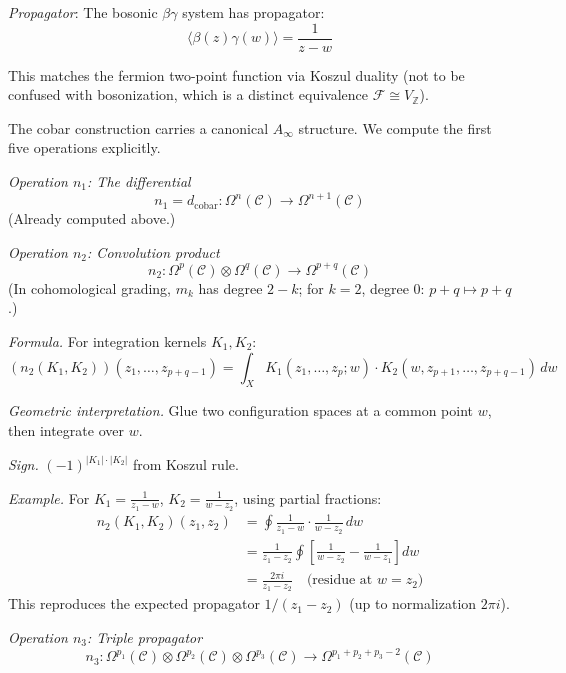 \begin{example}
\emph{Propagator}: The bosonic $\beta\gamma$ system has propagator:
\[\langle \beta(z) \gamma(w) \rangle = \frac{1}{z - w}\]

This matches the fermion two-point function via Koszul duality (not to be confused with bosonization, which is a distinct equivalence $\mathcal{F} \cong V_{\mathbb{Z}}$).
\end{example}

\begin{example}
\label{ex:cobar-ainfty-n5}

The cobar construction carries a canonical $A_\infty$ structure. We compute the 
first five operations explicitly.

\emph{Operation $n_1$: The differential}
\[n_1 = d_{\text{cobar}}: \Omega^n(\mathcal{C}) \to \Omega^{n+1}(\mathcal{C})\]
(Already computed above.)

\emph{Operation $n_2$: Convolution product}
\[n_2: \Omega^p(\mathcal{C}) \otimes \Omega^q(\mathcal{C}) \to \Omega^{p+q}(\mathcal{C})\]
(In cohomological grading, $m_k$ has degree $2-k$; for $k=2$, degree $0$: $p+q \mapsto p+q$.)

\emph{Formula.} For integration kernels $K_1, K_2$:
\[(n_2(K_1, K_2))(z_1, \ldots, z_{p+q-1}) = \int_X K_1(z_1, \ldots, z_p; w) \cdot 
K_2(w, z_{p+1}, \ldots, z_{p+q-1}) \, dw\]

\emph{Geometric interpretation.} Glue two configuration spaces at a common point
$w$, then integrate over $w$.

\emph{Sign.} $(-1)^{|K_1| \cdot |K_2|}$ from Koszul rule.

\emph{Example.} For $K_1 = \frac{1}{z_1 - w}$, $K_2 = \frac{1}{w - z_2}$, using partial fractions:
\begin{align*}
n_2(K_1, K_2)(z_1, z_2) &= \oint \frac{1}{z_1 - w} \cdot \frac{1}{w - z_2} \, dw \\
&= \frac{1}{z_1 - z_2}\oint \left[\frac{1}{w - z_2} - \frac{1}{w - z_1}\right] dw \\
&= \frac{2\pi i}{z_1 - z_2} \quad \text{(residue at } w = z_2\text{)}
\end{align*}
This reproduces the expected propagator $1/(z_1 - z_2)$ (up to normalization $2\pi i$).

\emph{Operation $n_3$: Triple propagator}
\[n_3: \Omega^{p_1}(\mathcal{C}) \otimes \Omega^{p_2}(\mathcal{C}) \otimes 
\Omega^{p_3}(\mathcal{C}) \to \Omega^{p_1+p_2+p_3-2}(\mathcal{C})\]


\end{example}
